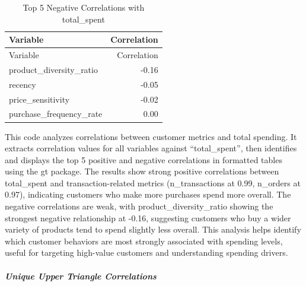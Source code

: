 \documentclass[
]{article}
\begin{document}
\begin{longtable}[]{@{}lr@{}}
\caption{Top 5 Negative Correlations with total\_spent}\tabularnewline
\toprule\noalign{}
Variable & Correlation \\
\midrule\noalign{}
\endfirsthead
\toprule\noalign{}
Variable & Correlation \\
\midrule\noalign{}
\endhead
\bottomrule\noalign{}
\endlastfoot
product\_diversity\_ratio & -0.16 \\
recency & -0.05 \\
price\_sensitivity & -0.02 \\
purchase\_frequency\_rate & 0.00 \\
\end{longtable}

This code analyzes correlations between customer metrics and total
spending. It extracts correlation values for all variables against
``total\_spent'', then identifies and displays the top 5 positive and
negative correlations in formatted tables using the gt package. The
results show strong positive correlations between total\_spent and
transaction-related metrics (n\_transactions at 0.99, n\_orders at
0.97), indicating customers who make more purchases spend more overall.
The negative correlations are weak, with product\_diversity\_ratio
showing the strongest negative relationship at -0.16, suggesting
customers who buy a wider variety of products tend to spend slightly
less overall. This analysis helps identify which customer behaviors are
most strongly associated with spending levels, useful for targeting
high-value customers and understanding spending drivers.\newpage

\subparagraph{Unique Upper Triangle
Correlations}\label{unique-upper-triangle-correlations}
\end{document}
